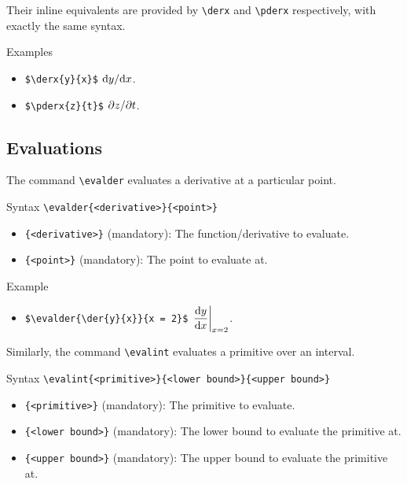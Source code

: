 Their inline equivalents are provided by \verb|\derx| and \verb|\pderx| respectively, with exactly the same syntax.

\begin{myframe}{Examples}
    \begin{itemize}
        \item \verb|$\derx{y}{x}$| \produces{} $\derx{y}{x}$.
        \item \verb|$\pderx{z}{t}$| \produces{} $\pderx{z}{t}$.
    \end{itemize}
\end{myframe}

\subsection{Evaluations}

The command \verb|\evalder| evaluates a derivative at a particular point.

\begin{myframe}{Syntax }
    \verb|\evalder{<derivative>}{<point>}|
    \begin{itemize}
        \item \verb|{<derivative>}| (mandatory): The function/derivative to evaluate.
        \item \verb|{<point>}| (mandatory): The point to evaluate at.
    \end{itemize}
\end{myframe}

\begin{myframe}{Example }
    \begin{itemize}
        \item \verb|$\evalder{\der{y}{x}}{x = 2}$| \produces{} $\displaystyle\evalder{\der{y}{x}}{x = 2}$.
    \end{itemize}
\end{myframe}

Similarly, the command \verb|\evalint| evaluates a primitive over an interval.

\begin{myframe}{Syntax }
    \verb|\evalint{<primitive>}{<lower bound>}{<upper bound>}|
    \begin{itemize}
        \item \verb|{<primitive>}| (mandatory): The primitive to evaluate.
        \item \verb|{<lower bound>}| (mandatory): The lower bound to evaluate the primitive at.
        \item \verb|{<upper bound>}| (mandatory): The upper bound to evaluate the primitive at.
    \end{itemize}
\end{myframe}


